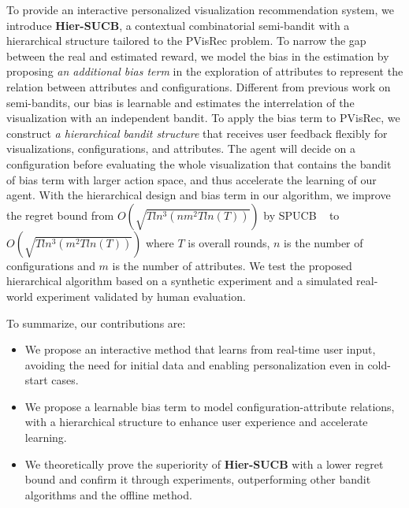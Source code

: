 To provide an interactive personalized visualization recommendation system, we introduce \textbf{Hier-SUCB}, a contextual combinatorial semi-bandit with a hierarchical structure tailored to the PVisRec problem. To narrow the gap between the real and estimated reward, we model the bias in the estimation by proposing \emph{an additional bias term} in the exploration of attributes to represent the relation between attributes and configurations. Different from previous work on semi-bandits, our bias is learnable and estimates the interrelation of the visualization with an independent bandit. 
To apply the bias term to PVisRec, we construct \emph{a hierarchical bandit structure} that receives user feedback flexibly for visualizations, configurations, and attributes. The agent will decide on a configuration before evaluating the whole visualization that contains the bandit of bias term with larger action space, and thus accelerate the learning of our agent.
With the hierarchical design and bias term in our algorithm, we improve the regret bound from $O(\sqrt{Tln^3(nm^2T ln(T))})$ by SPUCB ~\cite{peng2019practical} to $O(\sqrt{Tln^3(m^2T ln(T))})$ where $T$ is overall rounds, $n$ is the number of configurations and $m$ is the number of attributes. We test the proposed hierarchical algorithm based on a synthetic experiment and a simulated real-world experiment validated by human evaluation.

To summarize, our contributions are:
\begin{itemize}
    \item We propose an interactive method that learns from real-time user input, avoiding the need for initial data and enabling personalization even in cold-start cases.
    \item We propose a learnable bias term to model configuration-attribute relations, with a hierarchical structure to enhance user experience and accelerate learning.
    \item We theoretically prove the superiority of \textbf{Hier-SUCB} with a lower regret bound and confirm it through experiments, outperforming other bandit algorithms and the offline method.
\end{itemize}